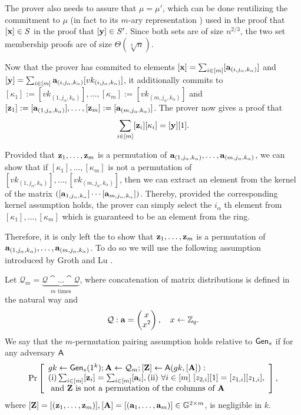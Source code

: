 The prover also needs to assure that $\mu=\mu'$, which can be done reutilizing the commitment to $\mu$ (in fact to its $m$-ary representation ) used in the proof that $[\mathbf{x}]\in S$ in the proof that $[\mathbf{y}]\in S'$. Since both sets are of size $n^{2/3}$, the two set membership proofs are of size $\Theta(\sqrt[3]{n})$.
 
Now that the prover has commited to elements $[\mathbf{x}]=\sum_{i\in[m]}[\mathbf{a}_{(i,j_\alpha,k_\alpha)}]$ and $[\mathbf{y}]=\sum_{i\in[m]}\mathbf{a}_{(i,j_\alpha,k_\alpha)}[vk_{(i,j_\alpha,k_\alpha)}]$, it additionally commits to $[\kappa_1]:=[vk_{(1,j_\alpha,k_\alpha)}],\allowbreak\ldots,\allowbreak[\kappa_m]:=[vk_{(m,j_\alpha,k_\alpha)}]$ and $[\mathbf{z}_1]:=[\mathbf{a}_{(1,j_\alpha,k_\alpha)}],\ldots,[\mathbf{z}_m]:=[\mathbf{a}_{(m,j_\alpha,k_\alpha)}]$. The prover now gives a proof that
\begin{equation}
\sum_{i\in[m]}[\mathbf{z}_i][\kappa_i]=[\mathbf{y}][1]. \label{eq:verif1}
\end{equation}

Provided that $\mathbf{z}_1,\ldots,\mathbf{z}_m$ is a permutation of $\mathbf{a}_{(1,j_\alpha,k_\alpha)},\ldots,\mathbf{a}_{(m,j_\alpha,k_\alpha)}$,
we can show that if $[\kappa_1],\ldots,[\kappa_m]$ is not a permutation of $[vk_{(1,j_\alpha,k_\alpha)}],\allowbreak\ldots,\allowbreak[vk_{(m,j_\alpha,k_\alpha)}]$, then we can extract an element from the kernel of the matrix $([\mathbf{a}_{1,j_\alpha,k_\alpha}]\cdots\allowbreak [\mathbf{a}_{m,j_\alpha,k_\alpha}])$. Thereby, provided the corresponding kernel assumption holds, the prover can simply select the $i_\alpha$ th element from $[\kappa_1],\ldots,\allowbreak [\kappa_m]$ which is guaranteed to be an element from the ring.

Therefore, it is only left the to show that $\mathbf{z}_1,\ldots,\mathbf{z}_m$ is a permutation of $\mathbf{a}_{(1,j_\alpha,k_\alpha)},\ldots,\mathbf{a}_{(m,j_\alpha,k_\alpha)}$. To do so we will use the following assumption introduced by Groth and Lu \cite{AC:GroLu07}.
\begin{definition}
Let $\mathcal{Q}_{m}=\underbrace{\mathcal{Q}\cat\ldots\cat\mathcal{Q}}_{m\text{ times}}$, where concatenation of matrix distributions is defined in the natural way and 
$$\mathcal{Q}: \mathbf{a}=\left(\begin{matrix}x\\x^2\end{matrix}\right),\quad x\gets\mathbb{Z}_q.$$
We say that the $m$-permutation pairing assumption holds relative to $\mathsf{Gen}_s$ if for any adversary $\mathsf{A}$
$$
\Pr\left[
\begin{array}{l}
gk\gets\mathsf{Gen}_s(1^k);\mathbf{{A}}\gets\mathcal{Q}_{m};[\mathbf{{Z}}]\gets\mathsf{A}(gk,[\mathbf{{A}}]):\\
\mathrm{(i)} \sum_{i\in[m]}[\mathbf{z}_i]=\sum_{i\in[m]}[\mathbf{a}_i], \mathrm{(ii)}\ \forall i\in[m]\ [z_{2,i}][1]=[z_{1,i}][z_{1,i}],\\
\text{ and }\mathbf{{Z}}\text{ is not a permutation of the columns of }\mathbf{{A}}
\end{array}
\right],
$$
where $[\mathbf{{Z}}]=[(\mathbf{z}_1,\ldots,\mathbf{z}_m)],[\mathbf{A}]=[(\mathbf{a}_1,\ldots,\mathbf{a}_m)]\in\mathbb{G}^{2\times m}$,
is negligible in $k$.
\end{definition}


